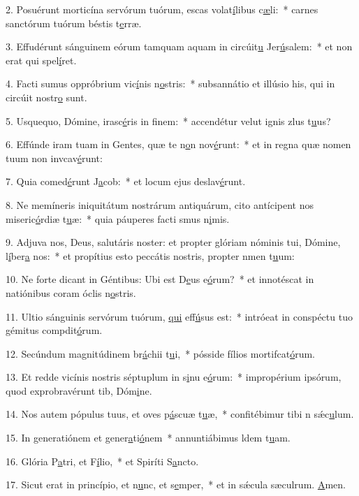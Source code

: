 2. Posuérunt morticína servórum tuórum, escas volat\uline{í}libus c\uline{æ}li:~* carnes sanctórum tuórum béstis t\uline{e}rræ.\par 
3. Effudérunt sánguinem eórum tamquam aquam in circúit\uline{u} Jer\uline{ú}salem:~* et non erat qui spel\uline{í}ret.\par 
4. Facti sumus oppróbrium vic\uline{í}nis n\uline{o}stris:~* subsannátio et illúsio his, qui in circúit nostr\uline{o} sunt.\par 
5. Usquequo, Dómine, irasc\uline{é}ris in f\uline{i}nem:~* accendétur velut ignis zlus t\uline{u}us?\par 
6. Effúnde iram tuam in Gentes, quæ te n\uline{o}n nov\uline{é}runt:~* et in regna quæ nomen tuum non invcav\uline{é}runt:\par 
7. Quia comed\uline{é}runt J\uline{a}cob:~* et locum ejus deslav\uline{é}runt.\par 
8. Ne memíneris iniquitátum nostrárum antiquárum, cito antícipent nos miseric\uline{ó}rdiæ t\uline{u}æ:~* quia páuperes facti smus n\uline{i}mis.\par 
9. Adjuva nos, Deus, salutáris noster: et propter glóriam nóminis tui, Dómine, l\uline{í}ber\uline{a} nos:~* et propítius esto peccátis nostris, propter nmen t\uline{u}um:\par 
10. Ne forte dicant in Géntibus: Ubi est D\uline{e}us e\uline{ó}rum?~* et innotéscat in natiónibus coram óclis n\uline{o}stris.\par 
11. Ultio sánguinis servórum tuórum, \uline{qui} eff\uline{ú}sus est:~* intróeat in conspéctu tuo gémitus compdit\uline{ó}rum.\par 
12. Secúndum magnitúdinem br\uline{á}chii t\uline{u}i,~* pósside fílios mortifcat\uline{ó}rum.\par 
13. Et redde vicínis nostris séptuplum in s\uline{i}nu e\uline{ó}rum:~* impropérium ipsórum, quod exprobravérunt tib, Dóm\uline{i}ne.\par 
14. Nos autem pópulus tuus, et oves p\uline{á}scuæ t\uline{u}æ,~* confitébimur tibi n sǽc\uline{u}lum.\par 
15. In generatiónem et gener\uline{a}ti\uline{ó}nem~* annuntiábimus ldem t\uline{u}am.\par 
16. Glória P\uline{a}tri, et F\uline{í}lio,~* et Spiríti S\uline{a}ncto.\par 
17. Sicut erat in princípio, et n\uline{u}nc, et s\uline{e}mper,~* et in sǽcula sæculrum. \uline{A}men.\par 
